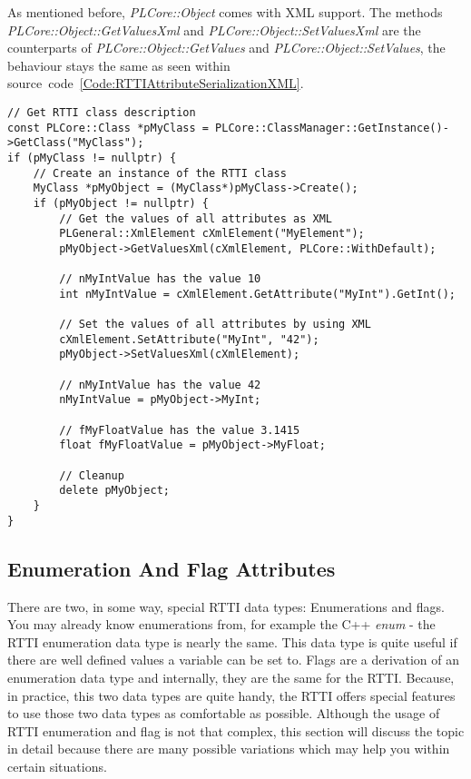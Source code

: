 As mentioned before, \emph{PLCore::Object} comes with XML support. The methods \emph{PLCore::Object::GetValuesXml} and \emph{PLCore::Object::SetValuesXml} are the counterparts of \emph{PLCore::Object::GetValues} and \emph{PLCore::Object::SetValues}, the behaviour stays the same as seen within source~code~\ref{Code:RTTIAttributeSerializationXML}.
\begin{lstlisting}[label=Code:RTTIAttributeSerializationXML,caption={RTTI object attributes serialization by using XML}]
// Get RTTI class description
const PLCore::Class *pMyClass = PLCore::ClassManager::GetInstance()->GetClass("MyClass");
if (pMyClass != nullptr) {
	// Create an instance of the RTTI class
	MyClass *pMyObject = (MyClass*)pMyClass->Create();
	if (pMyObject != nullptr) {
		// Get the values of all attributes as XML
		PLGeneral::XmlElement cXmlElement("MyElement");
		pMyObject->GetValuesXml(cXmlElement, PLCore::WithDefault);

		// nMyIntValue has the value 10
		int nMyIntValue = cXmlElement.GetAttribute("MyInt").GetInt();

		// Set the values of all attributes by using XML
		cXmlElement.SetAttribute("MyInt", "42");
		pMyObject->SetValuesXml(cXmlElement);

		// nMyIntValue has the value 42
		nMyIntValue = pMyObject->MyInt;

		// fMyFloatValue has the value 3.1415
		float fMyFloatValue = pMyObject->MyFloat;

		// Cleanup
		delete pMyObject;
	}
}
\end{lstlisting}



\subsection{Enumeration And Flag Attributes}
\label{ClassMembers:EnumerationAndFlagAttributes}
There are two, in some way, special RTTI data types: Enumerations and flags. You may already know enumerations from, for example the C++ \emph{enum} - the RTTI enumeration data type is nearly the same. This data type is quite useful if there are well defined values a variable can be set to. Flags are a derivation of an enumeration data type and internally, they are the same for the RTTI. Because, in practice, this two data types are quite handy, the RTTI offers special features to use those two data types as comfortable as possible. Although the usage of RTTI enumeration and flag is not that complex, this section will discuss the topic in detail because there are many possible variations which may help you within certain situations.


